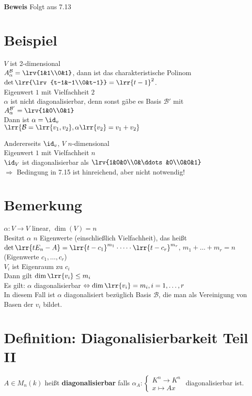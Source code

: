 	\textbf{Beweis} Folgt aus 7.13

\section{Beispiel}
	$V$ ist 2-dimensional\\
	$A_\alpha^\mathcal{B}=\lrv{1&1\\0&1}$, dann ist das charakteristische Polinom $\det\lrr{\lrv{t-1&-1\\0&t-1}}=\lrr{t-1}^2$.\\
	Eigenwert $1$ mit Vielfachheit $2$\\
	$\alpha$ ist nicht diagonalisierbar, denn sonst gäbe es Basis $\mathcal{B}'$ mit $A_\alpha^{\mathcal{B}'}=\lrv{1&0\\0&1}$\\
	Dann ist $\alpha=\id_v$\lightning\\
	$\lrr{\mathcal{B}=\lrr{v_1,v_2},\alpha\lrr{v_2}=v_1+v_2}$

	Andererseits $\id_v$, $V$ $n$-dimensional\\
	Eigenwert $1$ mit Vielfachheit $n$\\
	$\id_V$ ist diagonalisierbar als $\lrv{1&0&0\\0&\ddots&0\\0&0&1}$\\
	$\Rightarrow$ Bedingung in 7.15 ist hinreichend, aber nicht notwendig!

\section{Bemerkung}
	$\alpha:V\rightarrow V$ linear, $\dim(V)=n$\\
	Besitzt $\alpha$ $n$ Eigenwerte (einschließlich Vielfachheit), das heißt $\det\lrr{tE_n-A}=\lrr{t-c_1}^{m_1}\cdot\dots\cdot\lrr{t-c_r}^{m_r}$, $m_1+\dots+m_r=n$ (Eigenwerte $c_1,\dots,c_r$)\\
	$V_i$ ist Eigenraum zu $c_i$\\
	Dann gilt $\dim\lrr{v_i}\leq m_i$\\
	Es gilt: $\alpha$ diagonalisierbar $\Leftrightarrow\dim\lrr{v_i}=m_i, i=1,\dots, r$\\
	In diesem Fall ist $\alpha$ diagonalisiert bezüglich Basis $\mathcal{B}$, die man als Vereinigung von Basen der $v_i$ bildet.

\section{Definition: Diagonalisierbarkeit Teil II}
	$A\in M_n(k)$ heißt \textbf{diagonalisierbar} falls $\alpha_A:\begin{cases}K^n\rightarrow K^n\\x\mapsto Ax\end{cases}$ diagonalisierbar ist.

